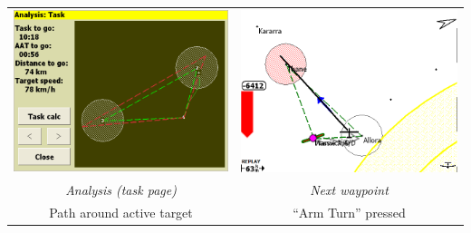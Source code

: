 \begin{maxipage}
\begin{center}
\begin{longtable}{|c|c|}
\midrule
\includegraphics[angle=0,width=0.45\linewidth,keepaspectratio='true']{figures/faat05.png} & 
\includegraphics[angle=0,width=0.45\linewidth,keepaspectratio='true']{figures/faat06.png} \\
\emph{Analysis (task page)} & \emph{Next waypoint} \\
Path around active target  & ``Arm Turn'' pressed \\
\bottomrule
\end{longtable}
\end{center}
\end{maxipage}

